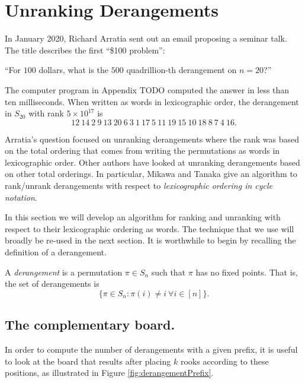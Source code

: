 \section{Unranking Derangements}

In January 2020, Richard Arratia sent out an email proposing a seminar talk.
The title describes the first ``\$100 problem'':
\begin{problem}
``For $100$ dollars, what is the $500$ quadrillion-th derangement on $n=20$?''
\end{problem}

\begin{answer}
The computer program in Appendix TODO computed the answer in less than ten
milliseconds. When written as words in lexicographic order, the
derangement in $S_{20}$ with rank $5 \times 10^{17}$ is \[
  12\ 14\ 2\ 9\ 13\ 20\ 6\ 3\ 1\ 17\ 5\ 11\ 19\ 15\ 10\ 18\ 8\ 7\ 4\ 16.
\]
\end{answer}

Arratia's question focused on unranking derangements where the rank was
based on the total ordering that comes from writing the
permutations as words in lexicographic order.
Other authors have looked at unranking derangements based on other total
orderings. In particular, Mikawa and Tanaka \cite{Mikawa2014} give an algorithm
to rank/unrank derangements
with respect to \textit{lexicographic ordering in cycle notation}.

In this section we will develop an algorithm for ranking and unranking with
respect to their lexicographic ordering as words. The technique that we use will
broadly be re-used in the next section.
It is worthwhile to begin by recalling the definition of a derangement.
\begin{definition}
  A \textit{derangement} is a permutation $\pi \in S_n$ such that $\pi$ has no
  fixed points. That is, the set of derangements is \[
    \{\pi \in S_n : \pi(i) \neq i\ \forall i \in [n]\}.
  \]
\end{definition}

\subsection{The complementary board.}
In order to compute the number of derangements with a given prefix, it is
useful to look at the board that results after placing $k$ rooks according to
these positions, as illustrated in Figure \ref{fig:derangementPrefix}.



